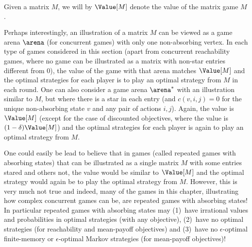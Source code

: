 
Given a matrix $M$, we will by $\Value[M]$ denote the value of the matrix game $M$. 

Perhaps interestingly, an illustration of a matrix $M$ can be viewed as a game arena $\arena$ (for concurrent games) with only one non-absorbing vertex. In each type of games considered in this section (apart from concurrent reachability games, where no game can be illustrated as a matrix with non-star entries different from 0), the value of the game with that arena matches $\Value[M]$ and the optimal strategies for each player is to play an optimal strategy from $M$ in each round. One can also consider a game arena $\arena^*$ with an illustration similar to $M$, but where there is a star in each entry (and $c(v,i,j)=0$ for the unique non-absorbing state $v$ and any pair of actions $i,j$).
Again, the value is $\Value[M]$ (except for the case of discounted objectives, where the value is $(1-\delta)\Value[M]$) and the optimal strategies for each player is again to play an optimal strategy from $M$. 

One could easily be lead to believe that in games (called repeated games with absorbing states) that can be illustrated as a single matrix $M$ with some entries stared and others not, the value would be similar to $\Value[M]$ and the optimal strategy would again be to play the optimal strategy from $M$. 
However, this is very much not true and indeed, many of the games in this chapter, illustrating how complex concurrent games can be, are repeated games with absorbing states! In particular repeated games with absorbing states may (1)~have irrational values and probabilities in optimal strategies (with any objective), (2)~have no optimal strategies (for reachability and mean-payoff objectives) and (3)~have no $\epsilon$-optimal finite-memory or $\epsilon$-optimal Markov strategies (for mean-payoff objectives)!
